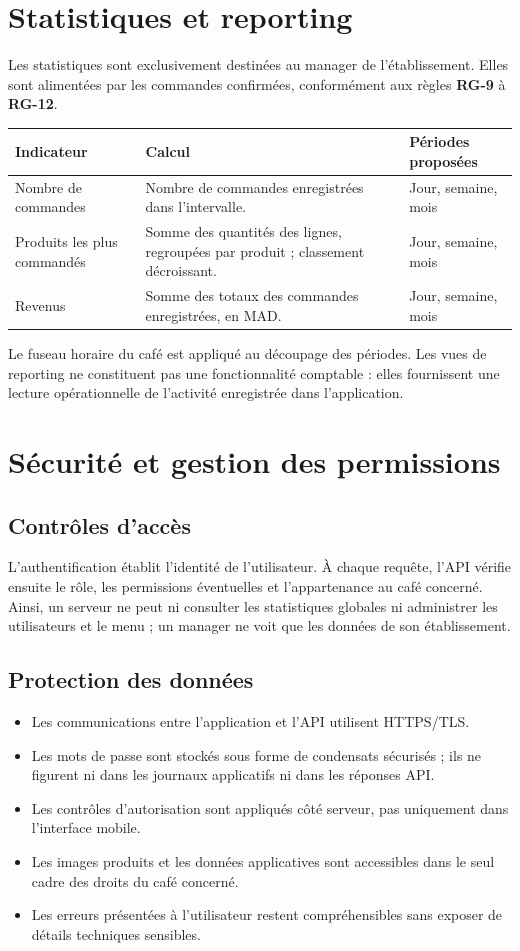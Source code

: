 \documentclass[11pt,a4paper]{article}
\begin{document}
\section{Statistiques et reporting}
Les statistiques sont exclusivement destinées au manager de l’établissement. Elles sont alimentées par les commandes confirmées, conformément aux règles \textbf{RG-9} à \textbf{RG-12}.

\begin{tabularx}{\textwidth}{P{0.28\textwidth}Y P{0.24\textwidth}}
\toprule
\textbf{Indicateur} & \textbf{Calcul} & \textbf{Périodes proposées} \\
\midrule
Nombre de commandes & Nombre de commandes enregistrées dans l’intervalle. & Jour, semaine, mois \\
Produits les plus commandés & Somme des quantités des lignes, regroupées par produit ; classement décroissant. & Jour, semaine, mois \\
Revenus & Somme des totaux des commandes enregistrées, en MAD. & Jour, semaine, mois \\
\bottomrule
\end{tabularx}

Le fuseau horaire du café est appliqué au découpage des périodes. Les vues de reporting ne constituent pas une fonctionnalité comptable : elles fournissent une lecture opérationnelle de l’activité enregistrée dans l’application.

\section{Sécurité et gestion des permissions}
\subsection{Contrôles d’accès}
L’authentification établit l’identité de l’utilisateur. À chaque requête, l’API vérifie ensuite le rôle, les permissions éventuelles et l’appartenance au café concerné. Ainsi, un serveur ne peut ni consulter les statistiques globales ni administrer les utilisateurs et le menu ; un manager ne voit que les données de son établissement.

\subsection{Protection des données}
\begin{itemize}
  \item Les communications entre l’application et l’API utilisent HTTPS/TLS.
  \item Les mots de passe sont stockés sous forme de condensats sécurisés ; ils ne figurent ni dans les journaux applicatifs ni dans les réponses API.
  \item Les contrôles d’autorisation sont appliqués côté serveur, pas uniquement dans l’interface mobile.
  \item Les images produits et les données applicatives sont accessibles dans le seul cadre des droits du café concerné.
  \item Les erreurs présentées à l’utilisateur restent compréhensibles sans exposer de détails techniques sensibles.
\end{itemize}
\end{document}
